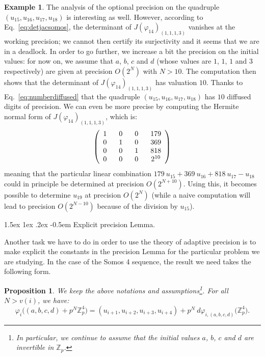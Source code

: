 \documentclass[11pt]{article}
\makeatletter
\numberwithin{equation}{section}
\numberwithin{figure}{section}
\renewcommand\subparagraph{\@startsection{subparagraph}{5}{\z@}%
                                       {1.5ex \@plus1ex \@minus .2ex}%
                                       {-0.5em}%
                                      {\normalfont\normalsize\it}}
\newtheorem{prop}[theo]{Proposition}
\theoremstyle{definition}
\newtheorem*{ex*}{Example}
\newcommand{\Z}{\mathbb Z}
\newcommand{\Zp}{\Z_p}
\makeatother
\begin{document}
\begin{ex*}
The analysis of the optional precision on the quadruple $(u_{15}, 
u_{16}, u_{17}, u_{18})$ is interesting as well. However, according to 
Eq.~\eqref{eq:detjacsomos}, the determinant of $J(\varphi_{14})_{(1,1, 
1,3)}$ vanishes at the working precision; we cannot then certify its 
surjectivity and it seems that we are in a deadlock. In order to go 
further, we increase a bit the precision on the initial values: for now 
on, we assume that $a$, $b$, $c$ and $d$ (whose values are $1$, $1$, $1$ 
and $3$ respectively) are given at precision $O(2^N)$ with $N > 10$. 
The computation then shows that the determinant of $J(\varphi_{14})_ 
{(1,1,1,3)}$ has valuation $10$. 
Thanks to Eq.~\eqref{eq:numberdiffused} that the quadruple $(u_{15}, 
u_{16}, u_{17}, u_{18})$ has $10$ diffused digits of precision. We
can even be more precise by computing the Hermite normal form of 
$J(\varphi_{14})_{(1,1,1,3)}$, which is:
$$\left( \begin{array}{c@{\hspace{4ex}}c@{\hspace{4ex}}c@{\hspace{4ex}}c}
1 & 0 & 0 & 179 \\
0 & 1 & 0 & 369 \\
0 & 0 & 1 & 818 \\
0 & 0 & 0 & 2^{10} \\
\end{array}\right)$$
meaning that the particular linear combination $179 \: u_{15} + 369 \: u_{16} 
+ 818 \: u_{17} - u_{18}$ could in principle be determined at precision 
$O(2^{N+10})$. Using this, it becomes possible to determine $u_{19}$ at
precision $O(2^N)$ (while a naive computation will lead to precision
$O(2^{N-10})$ because of the division by $u_{15}$).
\end{ex*}

\subparagraph{Explicit precision Lemma.}

Another task we have to do in order to use the theory of adaptive
precision is to make explicit the constants in the precision Lemma
for the particular problem we are studying. In the case of the Somos
4 sequence, the result we need takes the following form.

\begin{prop}
\label{prop:preclemmasomos}
We keep the above notations and assumptions\footnote{In particular,
we continue to assume that the initial values $a$, $b$, $c$ and $d$
are invertible in $\Zp$.}.
For all $N > v(i)$, we have:
$$\varphi_i\big((a,b,c,d) + p^N \Zp^4\big) =
(u_{i+1}, u_{i+2}, u_{i+3}, u_{i+4}) + 
p^N \: d \varphi_{i,(a,b,c,d)}\big(\Zp^4\big).$$
\end{prop}
\end{document}
